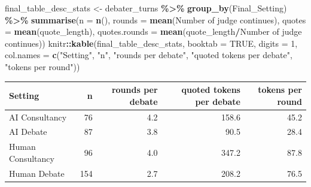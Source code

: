 \documentclass[
]{article}
\newenvironment{Shaded}{\begin{snugshade}}{\end{snugshade}}
\newcommand{\AttributeTok}[1]{\textcolor[rgb]{0.13,0.29,0.53}{#1}}
\newcommand{\ConstantTok}[1]{\textcolor[rgb]{0.56,0.35,0.01}{#1}}
\newcommand{\DecValTok}[1]{\textcolor[rgb]{0.00,0.00,0.81}{#1}}
\newcommand{\FunctionTok}[1]{\textcolor[rgb]{0.13,0.29,0.53}{\textbf{#1}}}
\newcommand{\NormalTok}[1]{#1}
\newcommand{\OtherTok}[1]{\textcolor[rgb]{0.56,0.35,0.01}{#1}}
\newcommand{\SpecialCharTok}[1]{\textcolor[rgb]{0.81,0.36,0.00}{\textbf{#1}}}
\newcommand{\StringTok}[1]{\textcolor[rgb]{0.31,0.60,0.02}{#1}}
\begin{document}
\begin{Shaded}
\begin{Highlighting}[]
\NormalTok{final\_table\_desc\_stats }\OtherTok{\textless{}{-}}\NormalTok{ debater\_turns }\SpecialCharTok{\%\textgreater{}\%} \FunctionTok{group\_by}\NormalTok{(Final\_Setting) }\SpecialCharTok{\%\textgreater{}\%} \FunctionTok{summarise}\NormalTok{(}\AttributeTok{n =} \FunctionTok{n}\NormalTok{(), }\AttributeTok{rounds =} \FunctionTok{mean}\NormalTok{(}\StringTok{\textasciigrave{}}\AttributeTok{Number of judge continues}\StringTok{\textasciigrave{}}\NormalTok{), }\AttributeTok{quotes =} \FunctionTok{mean}\NormalTok{(quote\_length), }\AttributeTok{quotes.rounds =} \FunctionTok{mean}\NormalTok{(quote\_length}\SpecialCharTok{/}\StringTok{\textasciigrave{}}\AttributeTok{Number of judge continues}\StringTok{\textasciigrave{}}\NormalTok{))}
\NormalTok{knitr}\SpecialCharTok{::}\FunctionTok{kable}\NormalTok{(final\_table\_desc\_stats, }\AttributeTok{booktab =} \ConstantTok{TRUE}\NormalTok{, }\AttributeTok{digits =} \DecValTok{1}\NormalTok{, }\AttributeTok{col.names =} \FunctionTok{c}\NormalTok{(}\StringTok{"Setting"}\NormalTok{, }\StringTok{"n"}\NormalTok{, }\StringTok{"rounds per debate"}\NormalTok{, }\StringTok{"quoted tokens per debate"}\NormalTok{, }\StringTok{"tokens per round"}\NormalTok{))}
\end{Highlighting}
\end{Shaded}

\begin{tabular}{lrrrr}
\toprule
Setting & n & rounds per debate & quoted tokens per debate & tokens per round\\
\midrule
AI Consultancy & 76 & 4.2 & 158.6 & 45.2\\
AI Debate & 87 & 3.8 & 90.5 & 28.4\\
Human Consultancy & 96 & 4.0 & 347.2 & 87.8\\
Human Debate & 154 & 2.7 & 208.2 & 76.5\\
\bottomrule
\end{tabular}
\end{document}
